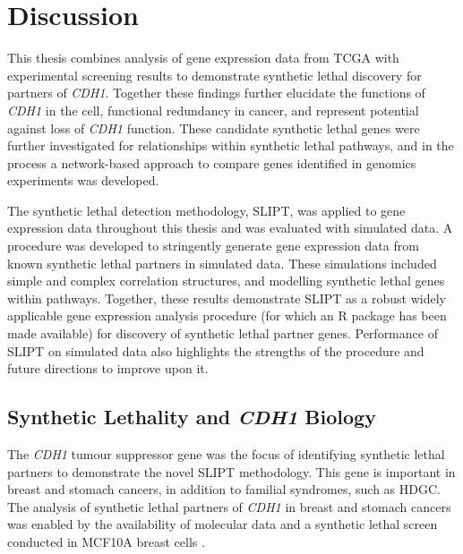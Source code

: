 \chapter{Discussion}
\label{chap:discussion}

This thesis combines analysis of \gls{gene expression} data from \gls{TCGA} with experimental screening results \citep{Telford2015} to demonstrate \gls{synthetic lethal} discovery for partners of \textit{CDH1}. %
Together these findings further elucidate the functions of \textit{CDH1} in the cell, \gls{functional redundancy} in cancer, and represent potential  against loss of \textit{CDH1} function. These candidate \gls{synthetic lethal} genes were further investigated for relationships within \gls{synthetic lethal} pathways, and in the process a network-based approach to compare genes identified in \glspl{genomic} experiments was developed.

The \gls{synthetic lethal} detection methodology, \gls{SLIPT}, was applied to \gls{gene expression} data throughout this thesis and was evaluated with simulated data. A procedure was developed to stringently generate \gls{gene expression} data from known \gls{synthetic lethal} partners in simulated data. These simulations included simple and complex correlation structures, and modelling \gls{synthetic lethal} genes within pathways. Together, these results demonstrate \gls{SLIPT} as a robust widely applicable \gls{gene expression} analysis procedure (for which an R package has been made available) for discovery of \gls{synthetic lethal} partner genes. Performance of \gls{SLIPT} on simulated data also highlights the strengths of the procedure and future directions to improve upon it.

\section{Synthetic Lethality and \textit{CDH1} Biology}
\label{chapt6:implications}

The \textit{CDH1} \gls{tumour suppressor} gene was the focus of identifying \gls{synthetic lethal} partners to demonstrate the novel \gls{SLIPT} methodology. This gene is important in  breast and stomach cancers, in addition to \gls{familial} syndromes, such as \gls{HDGC}. The analysis of \gls{synthetic lethal} partners of \textit{CDH1} in breast and stomach cancers was enabled by the availability of molecular data \citep{TCGA2012, TCGA2014GC} and a \gls{synthetic lethal} screen conducted in MCF10A breast cells \citep{Chen2014, Telford2015}.

